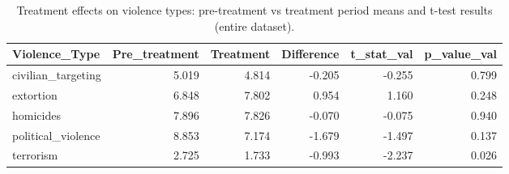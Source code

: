 \begin{table}

\caption{\label{tab:treatment_effects}Treatment effects on violence types: pre-treatment vs treatment period means and t-test results (entire dataset).}
\centering
\begin{tabular}[t]{lrrrrr}
\toprule
Violence\_Type & Pre\_treatment & Treatment & Difference & t\_stat\_val & p\_value\_val\\
\midrule
civilian\_targeting & 5.019 & 4.814 & -0.205 & -0.255 & 0.799\\
extortion & 6.848 & 7.802 & 0.954 & 1.160 & 0.248\\
homicides & 7.896 & 7.826 & -0.070 & -0.075 & 0.940\\
political\_violence & 8.853 & 7.174 & -1.679 & -1.497 & 0.137\\
terrorism & 2.725 & 1.733 & -0.993 & -2.237 & 0.026\\
\bottomrule
\end{tabular}
\end{table}
